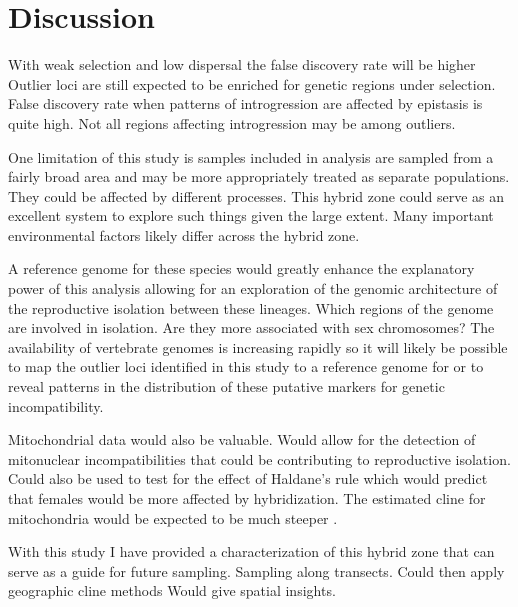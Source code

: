\section{Discussion}

With weak selection and low dispersal the false discovery rate will be higher \parencite{gompert2011}
Outlier loci are still expected to be enriched for genetic regions under selection.
False discovery rate when patterns of introgression are affected by epistasis
is quite high. Not all regions affecting introgression may be among outliers.  


One limitation of this study is samples included in analysis are sampled from 
a fairly broad area and may be more appropriately treated as separate populations.
They could be affected by different processes. %
This hybrid zone could serve as an excellent system to explore such things
given the large extent. Many important environmental factors likely differ 
across the hybrid zone.


A reference genome for these species would greatly enhance the explanatory power of
this analysis allowing for an exploration of the genomic architecture of the   
reproductive isolation between these lineages. Which regions of the genome are 
involved in isolation. Are they more associated with sex chromosomes?
The availability of vertebrate genomes is increasing rapidly so it will likely 
be possible to map the outlier loci identified in this study to a reference genome
for \amer or \terr to reveal patterns in the distribution of these putative 
markers for genetic incompatibility. 


Mitochondrial data would also be valuable. Would allow for the detection of 
mitonuclear incompatibilities that could be contributing to reproductive isolation.
Could also be used to test for the effect of Haldane's rule which would predict  
that females would be more affected by hybridization. The estimated cline
for mitochondria would be expected to be much steeper \parencite{carling2008}.

With this study I have provided a characterization of this hybrid zone that can
serve as a guide for future sampling. 
Sampling along transects.
Could then apply geographic cline methods
Would give spatial insights.



